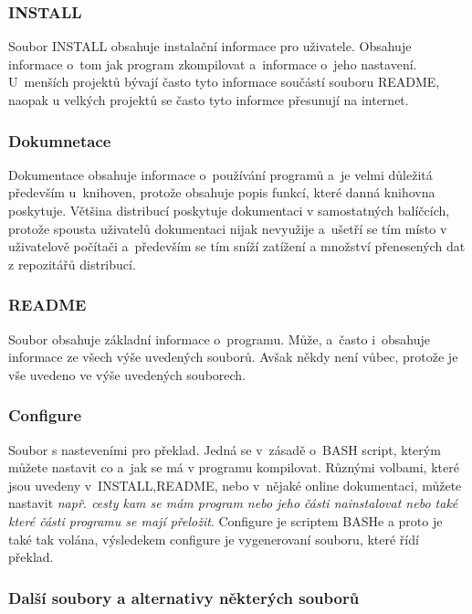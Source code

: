 \documentclass[a4paper,12pt]{article}
\renewcommand{\it}[1]{\textit{#1}}		%
\begin{document}
\subsubsection{INSTALL}
Soubor INSTALL obsahuje instalační informace pro uživatele. Obsahuje informace o~tom jak program zkompilovat a~informace o~jeho nastavení. U~menších projektů bývají často tyto informace součástí souboru README, naopak u velkých projektů se často tyto informce přesunují na internet.
\subsubsection{Dokumnetace}
Dokumentace obsahuje informace o~používání programů a~je velmi důležitá především u~knihoven, protože obsahuje popis funkcí, které danná knihovna poskytuje. Většina distribucí poskytuje dokumentaci v samostatných balíčcích, protože spousta uživatelů dokumentaci nijak nevyužije a~ušetří se tím místo v uživatelově počítači a~především se tím sníží zatížení a množství přenesených dat z repozitářů distribucí.
\subsubsection{README}
Soubor obsahuje základní informace o~programu. Může, a~často i~obsahuje informace ze všech výše uvedených souborů. Avšak někdy není vůbec, protože je vše uvedeno ve výše uvedených souborech.
\subsubsection{Configure}
Soubor s nasteveními pro překlad. Jedná se v~zásadě o~BASH script, kterým můžete nastavit co a~jak se má v programu kompilovat. Různými volbami, které jsou uvedeny v~INSTALL,README, nebo v~nějaké online dokumentaci, můžete nastavit \it{např. cesty kam se mám program nebo jeho části nainstalovat nebo také které části programu se mají přeložit}. Configure je scriptem BASHe a proto je také tak volána, výsledekem configure je vygenerovaní souboru, které řídí překlad.
\subsubsection{Další soubory a alternativy některých souborů}
\end{document}
